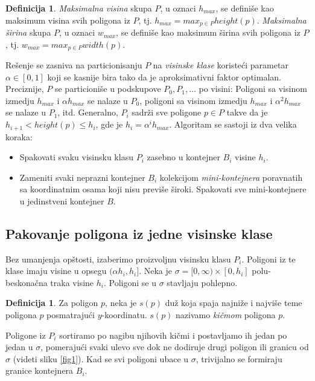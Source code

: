 \documentclass[a4paper]{article}
\theoremstyle{plain}
\theoremstyle{definition}
\newtheorem{defn}[thm]{Definicija} %
\begin{document}
\begin{defn}
    \emph{Maksimalna visina} skupa $P$, u oznaci \emph{$h_{max}$}, se defini\v{s}e kao maksimum visina svih poligona iz $P$, tj. $h_{max} = max_{p \in P}height(p)$. \emph{Maksimalna \v{s}irina} skupa $P$, u oznaci \emph{$w_{max}$}, se defini\v{s}e kao maksimum \v{s}irina svih poligona iz $P$, tj. $w_{max} = max_{p \in P}width(p)$. 
\end{defn}

Re\v{s}enje se zasniva na particionisanju $P$ na \emph{visinske klase} koriste\'c{}i parametar $\alpha \in [0, 1]$ koji se kasnije bira tako da je aproksimativni faktor optimalan. Preciznije, $P$ se particioni\v{s}e u podskupove $P_{0}, P_{1}, \dots$ po visini: Poligoni sa visinom izmedju $h_{max}$ i $\alpha h_{max}$ se nalaze u $P_{0}$, poligoni sa visinom izmedju $h_{max}$ i $\alpha^{2} h_{max}$ se nalaze u $P_{1}$, itd. Generalno, $P_{i}$ sadr\v{z}i sve poligone $p \in P$ takve da je $h_{i+1} < height(p) \leq h_{i}$, gde je $h_{i} = \alpha^{i}h_{max}$. Algoritam se sastoji iz dva velika koraka:
\begin{itemize}
    \item Spakovati svaku visinsku klasu $P_{i}$ zasebno u kontejner $B_{i}$ visine $h_{i}$.
    \item Zameniti svaki neprazni kontejner $B_{i}$ kolekcijom \emph{mini-kontejnera} poravnatih sa koordinatnim osama koji nisu previ\v{s}e \v{s}iroki. Spakovati sve mini-kontejnere u jedinstveni kontejner $B$.
\end{itemize}


\subsection{Pakovanje poligona iz jedne visinske klase}
\label{subsec:Korak1}

Bez umanjenja op\v{s}tosti, izaberimo proizvoljnu visinsku klasu $P_{i}$. Poligoni iz te klase imaju visine u opsegu $(\alpha h_{i}, h_{i}]$. Neka je $\sigma = [0, \infty) \times [0, h_{i}]$ polu-beskona\v{c}na traka visine $h_{i}$. Poligoni se u $\sigma$ stavljaju pohlepno.

\begin{defn}
    Za poligon $p$, neka je $s(p)$ du\v{z} koja spaja najni\v{z}e i najvi\v{s}e teme poligona $p$ posmatraju\'c{}i $y$-koordinatu. $s(p)$ nazivamo \emph{ki\v{c}mom} poligona $p$.
\end{defn}

Poligone iz $P_{i}$ sortiramo po nagibu njihovih ki\v{c}mi i postavljamo ih jedan po jedan u $\sigma$, pomeraju\'c{}i svaki ulevo sve dok ne dodiruje drugi poligon ili granicu od $\sigma$ (videti sliku \ref{fig1}). Kad se svi poligoni ubace u $\sigma$, trivijalno se formiraju granice kontejnera $B_{i}$.
\end{document}
